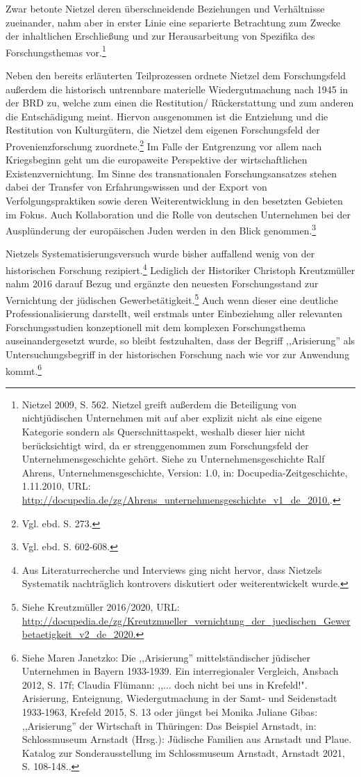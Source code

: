 Zwar betonte Nietzel deren überschneidende Beziehungen und Verhältnisse zueinander, nahm aber in erster Linie eine separierte Betrachtung zum Zwecke der inhaltlichen Erschließung und zur Herausarbeitung von Spezifika des Forschungsthemas vor.\footnote{Nietzel 2009, S. 562. Nietzel greift außerdem die Beteiligung von nichtjüdischen Unternehmen mit auf aber explizit nicht als eine eigene Kategorie sondern als Querschnittaspekt, weshalb dieser hier nicht berücksichtigt wird, da er strenggenommen zum Forschungsfeld der Unternehmensgeschichte gehört. Siehe zu Unternehmensgeschichte Ralf Ahrens, Unternehmensgeschichte, Version: 1.0, in: Docupedia-Zeitgeschichte, 1.11.2010, URL: \url{http://docupedia.de/zg/Ahrens_unternehmensgeschichte_v1_de_2010.}.} 

Neben den bereits erläuterten Teilprozessen ordnete Nietzel dem Forschungsfeld außerdem die historisch untrennbare materielle Wiedergutmachung nach 1945 in der BRD zu, welche zum einen die Restitution/ Rückerstattung und zum anderen die Entschädigung meint. Hiervon ausgenommen ist die Entziehung und die Restitution von Kulturgütern, die Nietzel dem eigenen Forschungsfeld der Provenienzforschung zuordnete.\footnote{Vgl. ebd. S. 273.} Im Falle der Entgrenzung vor allem nach Kriegsbeginn geht um die europaweite Perspektive der wirtschaftlichen Existenzvernichtung. Im Sinne des transnationalen Forschungsansatzes stehen dabei der Transfer von Erfahrungswissen und der Export von Verfolgungspraktiken sowie deren Weiterentwicklung in den besetzten Gebieten im Fokus. Auch Kollaboration und die Rolle von deutschen Unternehmen bei der Ausplünderung der europäischen Juden werden in den Blick genommen.\footnote{Vgl. ebd. S. 602-608.}

Nietzels Systematisierungsversuch wurde bisher auffallend wenig von der historischen Forschung rezipiert.\footnote{Aus Literaturrecherche und Interviews ging nicht hervor, dass Nietzels Systematik nachträglich kontrovers diskutiert oder weiterentwickelt wurde.} Lediglich der Historiker Christoph Kreutzmüller nahm 2016 darauf Bezug und ergänzte den neuesten Forschungsstand zur Vernichtung der jüdischen Gewerbetätigkeit.\footnote{Siehe Kreutzmüller 2016/2020,  URL: \url{http://docupedia.de/zg/Kreutzmueller_vernichtung_der_juedischen_Gewerbetaetigkeit_v2_de_2020.}} Auch wenn dieser eine deutliche Professionalisierung darstellt, weil erstmals unter Einbeziehung aller relevanten Forschungsstudien konzeptionell mit dem komplexen Forschungsthema auseinandergesetzt wurde, so bleibt festzuhalten, dass der Begriff ,,Arisierung'' als Untersuchungsbegriff in der historischen Forschung nach wie vor zur Anwendung kommt.\footnote{Siehe Maren Janetzko: Die ,,Arisierung'' mittelständischer jüdischer Unternehmen in Bayern 1933-1939. Ein interregionaler Vergleich, Ansbach 2012, S. 17f; Claudia Flümann: ,,... doch nicht bei uns in Krefeld!". Arisierung, Enteignung, Wiedergutmachung in der Samt- und Seidenstadt 1933-1963, Krefeld 2015, S. 13 oder jüngst bei Monika Juliane Gibas: ,,Arisierung'' der Wirtschaft in Thüringen: Das Beispiel Arnstadt, in: Schlossmuseum Arnstadt (Hrsg.): Jüdische Familien aus Arnstadt und Plaue. Katalog zur Sonderausstellung im Schlossmuseum Arnstadt, Arnstadt 2021, S. 108-148..} 

